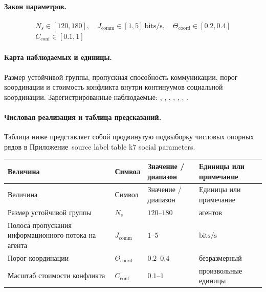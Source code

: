 \paragraph{Закон параметров.}
\[
\begin{gathered} N_s \in [120,180],\quad J_{\mathrm{comm}} \in [1,5]\,\mathrm{bits/s},\quad \Theta_{\mathrm{coord}} \in [0.2,0.4] \\ C_{\mathrm{conf}} \in [0.1,1] \end{gathered}
\]

\paragraph{Карта наблюдаемых и единицы.}
Размер устойчивой группы, пропускная способность коммуникации, порог координации и стоимость конфликта внутри континуумов социальной координации.
Зарегистрированные наблюдаемые: , \allowbreak {}, \allowbreak {}, \allowbreak {}, \allowbreak {}, \allowbreak {}, \allowbreak {}.

\paragraph{Числовая реализация и таблица предсказаний.}
Таблица ниже представляет собой продвинутую подвыборку числовых опорных рядов в Приложение~source label table k7 social parameters.
\begin{longtable}{@{}L{0.27\textwidth}L{0.15\textwidth}L{0.24\textwidth}L{0.16\textwidth}@{}}
\toprule
Величина & Символ & Значение / диапазон & Единицы или примечание \\
\midrule
\endfirsthead
\toprule
Величина & Символ & Значение / диапазон & Единицы или примечание \\
\midrule
\endhead
Размер устойчивой группы & $\scriptstyle N_s$ & $120\text{--}180$ & агентов \\
Полоса пропускания информационного потока на агента & $\scriptstyle J_{\mathrm{comm}}$ & $1\text{--}5$ & $\mathrm{bits/s}$ \\
Порог координации & $\scriptstyle \Theta_{\mathrm{coord}}$ & $0.2\text{--}0.4$ & безразмерный \\
Масштаб стоимости конфликта & $\scriptstyle C_{\mathrm{conf}}$ & $0.1\text{--}1$ & произвольные единицы \\
\bottomrule
\end{longtable}

